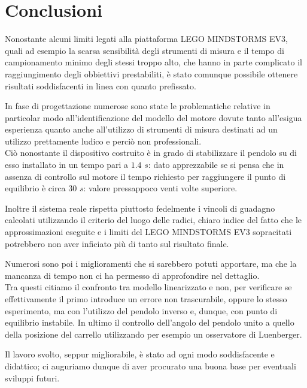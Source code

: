 \chapter{Conclusioni}
Nonostante alcuni limiti legati alla piattaforma LEGO MINDSTORMS EV3, quali ad esempio la scarsa sensibilità degli strumenti di misura e il tempo di campionamento minimo degli stessi troppo alto, che hanno in parte complicato il raggiungimento degli obbiettivi prestabiliti, è stato comunque possibile ottenere risultati soddisfacenti in linea con quanto prefissato.

In fase di progettazione numerose sono state le problematiche relative in particolar modo all'identificazione del modello del motore dovute tanto all'esigua esperienza quanto anche all'utilizzo di strumenti di misura destinati ad un utilizzo prettamente ludico e perciò non professionali.\\
Ciò nonostante il dispositivo costruito è in grado di stabilizzare il pendolo su di esso installato in un tempo pari a $1.4$ $s$: dato apprezzabile se si pensa che in assenza di controllo sul motore il tempo richiesto per raggiungere il punto di equilibrio è circa $30$ $s$: valore pressappoco venti volte superiore.

Inoltre il sistema reale rispetta piuttosto fedelmente i vincoli di guadagno calcolati utilizzando il criterio del luogo delle radici, chiaro indice del fatto che le approssimazioni eseguite e i limiti del LEGO MINDSTORMS EV3 sopracitati potrebbero non aver inficiato più di tanto sul risultato finale.

Numerosi sono poi i miglioramenti che si sarebbero potuti apportare, ma che la mancanza di tempo non ci ha permesso di approfondire nel dettaglio.\\
Tra questi citiamo il confronto tra modello linearizzato e non, per verificare se effettivamente il primo introduce un errore non trascurabile, oppure lo stesso esperimento, ma con l'utilizzo del pendolo inverso e, dunque, con punto di equilibrio instabile. In ultimo il controllo dell'angolo del pendolo unito a quello della posizione del carrello utilizzando per esempio un osservatore di Luenberger.

Il lavoro svolto, seppur migliorabile, è stato ad ogni modo soddisfacente e didattico; ci auguriamo dunque di aver procurato una buona base per eventuali sviluppi futuri.



